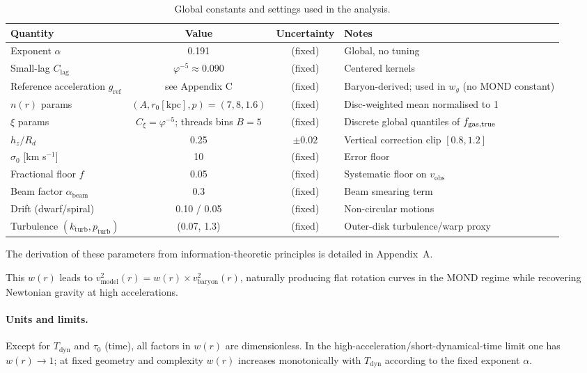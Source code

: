 \documentclass[usenatbib]{mnras}
\begin{document}
\begin{table*}
\centering
\small
\setlength{\tabcolsep}{6pt}
\caption{Global constants and settings used in the analysis.}
\label{tab:parameters}
\begin{tabularx}{0.97\textwidth}{l c c >{\raggedright\arraybackslash}X}
\toprule
Quantity & Value & Uncertainty & Notes \\
\midrule
Exponent $\alpha$ & 0.191 & (fixed) & Global, no tuning \\
Small-lag $C_\mathrm{lag}$ & $\varphi^{-5} \approx 0.090$ & (fixed) & Centered kernels \\
Reference acceleration $g_\mathrm{ref}$ & see Appendix C & (fixed) & Baryon-derived; used in $w_g$ (no MOND constant) \\
$n(r)$ params & $(A, r_0[\mathrm{kpc}], p)=(7,8,1.6)$ & (fixed) & Disc-weighted mean normalised to 1 \\
$\xi$ params & $C_\xi=\varphi^{-5}$; threads bins $B{=}5$ & (fixed) & Discrete global quantiles of $f_{\rm gas,true}$ \\
$h_z/R_d$ & 0.25 & $\pm 0.02$ & Vertical correction clip $[0.8,1.2]$ \\
$\sigma_0$ [km s$^{-1}$] & 10 & (fixed) & Error floor \\
Fractional floor $f$ & 0.05 & (fixed) & Systematic floor on $v_\mathrm{obs}$ \\
Beam factor $\alpha_\mathrm{beam}$ & 0.3 & (fixed) & Beam smearing term \\
Drift (dwarf/spiral) & 0.10 / 0.05 & (fixed) & Non-circular motions \\
Turbulence $(k_\mathrm{turb},p_\mathrm{turb})$ & (0.07, 1.3) & (fixed) & Outer-disk turbulence/warp proxy \\
\bottomrule
\end{tabularx}
\end{table*}

The derivation of these parameters from information-theoretic principles is detailed in Appendix~A.

This $w(r)$ leads to $v^2_\mathrm{model}(r) = w(r) \times v^2_\mathrm{baryon}(r)$, naturally producing flat rotation curves in the MOND regime while recovering Newtonian gravity at high accelerations.

\paragraph{Units and limits.} Except for $T_\mathrm{dyn}$ and $\tau_0$ (time), all factors in $w(r)$ are dimensionless. In the high-acceleration/short-dynamical-time limit one has $w(r)\to 1$; at fixed geometry and complexity $w(r)$ increases monotonically with $T_\mathrm{dyn}$ according to the fixed exponent $\alpha$.
\end{document}
